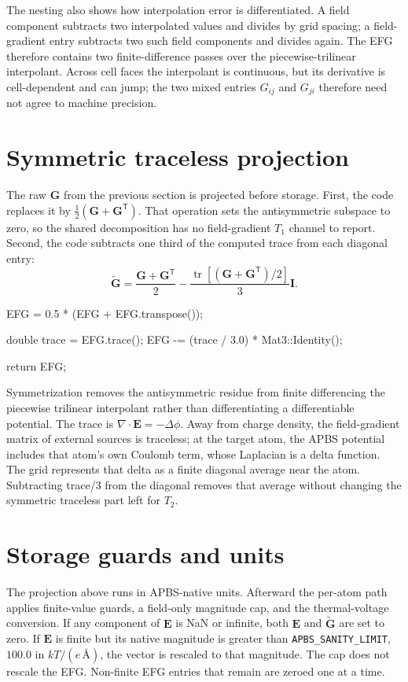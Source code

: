 \documentclass[11pt]{article}
\newcommand{\code}[1]{\texttt{#1}}
\begin{document}
The nesting also shows how interpolation error is differentiated. A field
component subtracts two interpolated values and divides by grid spacing; a
field-gradient entry subtracts two such field components and divides again. The
EFG therefore contains two finite-difference passes over the piecewise-trilinear
interpolant. Across cell faces the interpolant is continuous, but its derivative
is cell-dependent and can jump; the two mixed entries \(G_{ij}\) and \(G_{ji}\)
therefore need not agree to machine precision.

\section{Symmetric traceless projection}

The raw \(\bm G\) from the previous section is projected before storage. First,
the code replaces it by \(\tfrac12(\bm G+\bm G^{\mathsf T})\). That operation
sets the antisymmetric subspace to zero, so the shared decomposition has no
field-gradient \(T_1\) channel to report. Second, the code subtracts one third
of the computed trace from each diagonal entry:
\[
  \widetilde{\bm G}
  =
  \frac{\bm G+\bm G^{\mathsf T}}{2}
  -\frac{\operatorname{tr}\left[
        (\bm G+\bm G^{\mathsf T})/2\right]}{3}\bm I .
\]

\begin{codebox}
EFG = 0.5 * (EFG + EFG.transpose());

double trace = EFG.trace();
EFG -= (trace / 3.0) * Mat3::Identity();

return EFG;
\end{codebox}

Symmetrization removes the antisymmetric residue from finite differencing the
piecewise trilinear interpolant rather than differentiating a differentiable
potential. The trace is \(\nabla\cdot\bm E=-\Delta\phi\). Away from charge
density, the field-gradient matrix of external sources is traceless; at the
target atom, the APBS potential includes that atom's own Coulomb term, whose
Laplacian is a delta function. The grid represents that delta as a finite
diagonal average near the atom. Subtracting trace/3 from the diagonal removes
that average without changing the symmetric traceless part left for \(T_2\).

\section{Storage guards and units}

The projection above runs in APBS-native units. Afterward the per-atom path applies
finite-value guards, a field-only magnitude cap, and the thermal-voltage
conversion. If any component of \(\bm E\) is NaN or infinite, both \(\bm E\)
and \(\widetilde{\bm G}\) are set to zero. If \(\bm E\) is finite but its
native magnitude is greater than \code{APBS\_SANITY\_LIMIT}, \(100.0\) in
\(kT/(e\,\si{\angstrom})\), the vector is rescaled to that magnitude. The cap
does not rescale the EFG. Non-finite EFG entries that remain are zeroed one at
a time.
\end{document}
